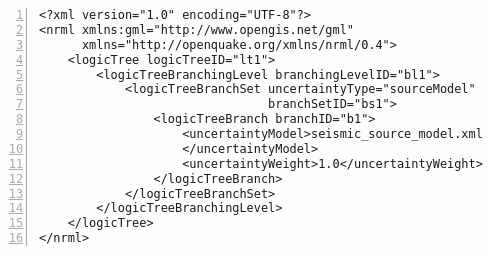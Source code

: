 \begin{Verbatim}[frame=single, commandchars=\\\{\}, fontsize=\small,
    firstnumber=1, numbers=left, numbersep=2pt]
<?xml version="1.0" encoding="UTF-8"?>
<nrml xmlns:gml="http://www.opengis.net/gml"
      xmlns="http://openquake.org/xmlns/nrml/0.4">
    <logicTree logicTreeID="lt1">
        <logicTreeBranchingLevel branchingLevelID="bl1">
            <logicTreeBranchSet uncertaintyType="sourceModel"
                                branchSetID="bs1">
                <logicTreeBranch branchID="b1">
                    <uncertaintyModel>seismic_source_model.xml
                    </uncertaintyModel>
                    <uncertaintyWeight>1.0</uncertaintyWeight>
                </logicTreeBranch>
            </logicTreeBranchSet>
        </logicTreeBranchingLevel>
    </logicTree>
</nrml>
\end{Verbatim}